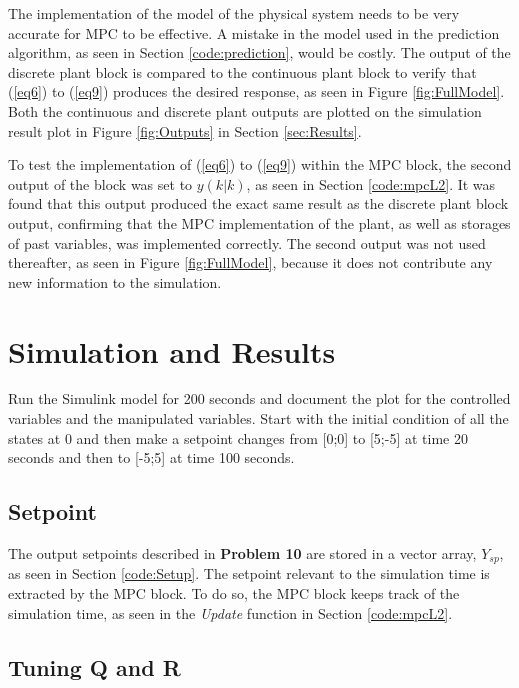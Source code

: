 \documentclass[12pt]{article}
\newenvironment{problem}[2][Problem]{\begin{trivlist}
		\item[\hskip \labelsep {\bfseries #1}\hskip \labelsep {\bfseries #2.}]}{\end{trivlist}}
\begin{document}
The implementation of the model of the physical system needs to be very accurate for MPC to be effective. A mistake in the model used in the prediction algorithm, as seen in Section \ref{code:prediction}, would be costly. The output of the discrete plant block is compared to the continuous plant block to verify that (\ref{eq6}) to (\ref{eq9}) produces the desired response, as seen in Figure \ref{fig:FullModel}. Both the continuous and discrete plant outputs are plotted on the simulation result plot in Figure \ref{fig:Outputs} in Section \ref{sec:Results}.

To test the implementation of (\ref{eq6}) to (\ref{eq9}) within the MPC block, the second output of the block was set to $y(k|k)$, as seen in Section \ref{code:mpcL2}. It was found that this output produced the exact same result as the discrete plant block output, confirming that the MPC implementation of the plant, as well as storages of past variables, was implemented correctly. The second output was not used thereafter, as seen in Figure \ref{fig:FullModel}, because it does not contribute any new information to the simulation.

\section{Simulation and Results}

\begin{problem}{10} Run the Simulink model for 200 seconds and document the plot for the controlled variables and the manipulated variables. Start with the initial condition of all the states at 0 and then make a setpoint changes from [0;0] to [5;-5] at time 20 seconds and then to [-5;5] at time 100 seconds. \end{problem}

\subsection{Setpoint}

The output setpoints described in \textbf{Problem 10} are stored in a vector array, $Y_{sp}$, as seen in Section \ref{code:Setup}. The setpoint relevant to the simulation time is extracted by the MPC block. To do so, the MPC block keeps track of the simulation time, as seen in the \textit{Update} function in Section \ref{code:mpcL2}.

\subsection{Tuning Q and R}
\label{sec:QandR}
\end{document}
